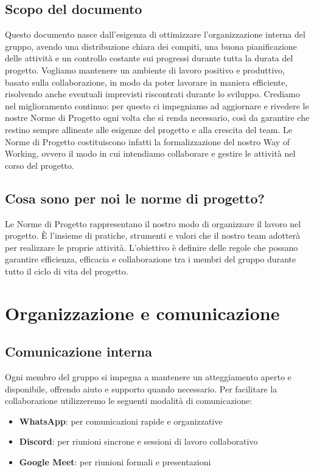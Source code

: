 \documentclass[11pt,a4paper]{article}
\begin{document}
\subsection{Scopo del documento}
Questo documento nasce dall’esigenza di ottimizzare l’organizzazione interna del gruppo, avendo una distribuzione chiara dei compiti, una buona pianificazione delle attività e un controllo costante sui progressi durante tutta la durata del progetto. Vogliamo mantenere un ambiente di
lavoro positivo e produttivo, basato sulla collaborazione, in modo da poter lavorare in maniera efficiente, risolvendo anche eventuali imprevisti riscontrati durante lo sviluppo.
Crediamo nel miglioramento continuo: per questo ci impegniamo ad aggiornare e rivedere le nostre Norme di Progetto ogni volta che si renda necessario, così da garantire che restino sempre allineate alle esigenze del progetto e alla crescita del team. Le Norme di Progetto costituiscono infatti la formalizzazione del nostro Way of Working, ovvero il modo in cui intendiamo collaborare e gestire le attività nel corso del progetto.

\subsection{Cosa sono per noi le norme di progetto?}
Le Norme di Progetto rappresentano il nostro modo di organizzare il lavoro nel progetto. È l’insieme di pratiche, strumenti e valori che il nostro team adotterà per realizzare le proprie attività. L’obiettivo è definire delle regole che possano garantire efficienza, efficacia e collaborazione tra i membri del gruppo durante tutto il ciclo di vita del progetto.

\newpage

\section{Organizzazione e comunicazione}

\subsection{Comunicazione interna}
Ogni membro del gruppo si impegna a mantenere un atteggiamento aperto e disponibile, offrendo aiuto e supporto quando necessario. Per facilitare la collaborazione utilizzeremo le seguenti modalità di comunicazione:
\begin{itemize}
    \item \textbf{WhatsApp}: per comunicazioni rapide e organizzative
    \item \textbf{Discord}: per riunioni sincrone e sessioni di lavoro collaborativo
    \item \textbf{Google Meet}: per riunioni formali e presentazioni
\end{itemize}
\end{document}
